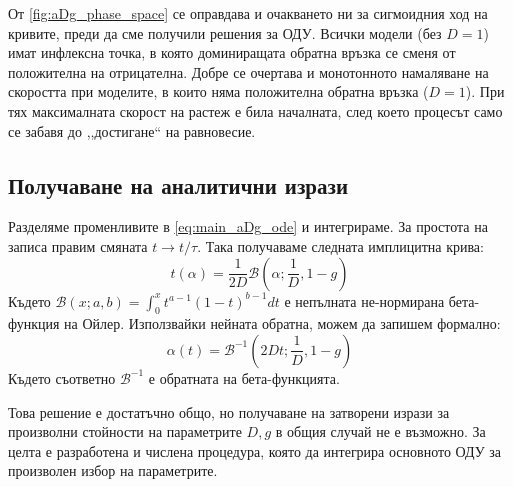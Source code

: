 От \autoref{fig:aDg_phase_space} се оправдава и очакването ни за сигмоидния ход на кривите, преди да сме получили решения за ОДУ. Всички модели (без $D=1$) имат инфлексна точка, в която доминиращата обратна връзка се сменя от положителна на отрицателна. Добре се очертава и монотонното намаляване на скоростта при моделите, в които няма положителна обратна връзка ($D=1$). При тях максималната скорост на растеж е била началната, след което процесът само се забавя до ,,достигане`` на равновесие.

\subsection{Получаване на аналитични изрази}
\label{sub:analytic_results}
Разделяме променливите в \autoref{eq:main_aDg_ode} и интегрираме. За простота на записа правим смяната $t \rightarrow t/\tau$. Така получаваме следната имплицитна крива:
\begin{equation}
	\label{eq:integral_aDg_beta_implicit}
	t(\alpha) = \frac{1}{2D}\mathcal{B}\left(\alpha; \frac{1}{D}, 1 - g \right)
\end{equation}
Където $\mathcal{B}\left(x; a, b \right) = \int_{0}^{x} t^{a-1} (1-t)^{b-1} dt$ е непълната не-нормирана бета-функция на Ойлер. Използвайки нейната обратна, можем да запишем формално:
\begin{equation}
	\label{eq:integral_aDg_beta_inverse}
	\alpha(t) = \mathcal{B}^{-1}\left( 2Dt; \frac{1}{D}, 1 - g \right)
\end{equation}
Където съответно $\mathcal{B}^{-1}$ е обратната на бета-функцията. 

Това решение е достатъчно общо, но получаване на затворени изрази за произволни стойности на параметрите $D, g$ в общия случай не е възможно. За целта е разработена и числена процедура, която да интегрира основното ОДУ за произволен избор на параметрите.

